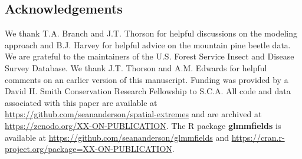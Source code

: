 \documentclass[12pt,english]{article}
\begin{document}
\begin{spacing}{1.8}
%
%

\section{Acknowledgements}

We thank T.A. Branch and J.T. Thorson for helpful discussions on the modeling
approach and B.J. Harvey for helpful advice on the mountain pine beetle data.
We are grateful to the maintainers of the U.S. Forest Service Insect and Disease
Survey Database.
We thank J.T. Thorson and A.M. Edwards for helpful comments on an earlier
version of this manuscript.
Funding was provided by a David H. Smith Conservation Research
Fellowship to S.C.A.
All code and data associated with this paper are available at
\url{https://github.com/seananderson/spatial-extremes} and are archived at
\url{https://zenodo.org/XX-ON-PUBLICATION}.
The R package \textbf{glmmfields} is available at
\url{https://github.com/seananderson/glmmfields} and
\url{https://cran.r-project.org/package=XX-ON-PUBLICATION}.


\end{spacing}
\end{document}

